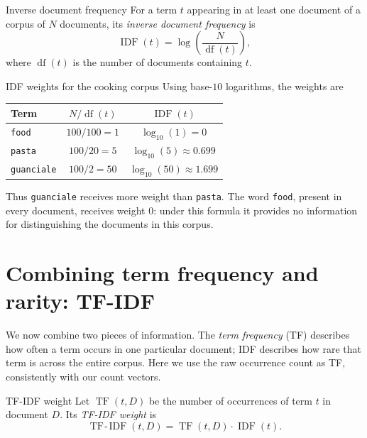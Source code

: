\documentclass[a4paper,12pt,oneside]{report}
\begin{document}
\begin{frameddefn}{Inverse document frequency}\label{def:idf}
For a term $t$ appearing in at least one document of a corpus of $N$
documents, its \emph{inverse document frequency} is
\[
  \operatorname{IDF}(t)
  =\log\left(\frac{N}{\operatorname{df}(t)}\right),
\]
where $\operatorname{df}(t)$ is the number of documents containing $t$.
\end{frameddefn}

\begin{framedexample}{IDF weights for the cooking corpus}
Using base-$10$ logarithms, the weights are
\begin{center}
\begin{tabular}{l|c|c}
  Term & $N/\operatorname{df}(t)$ & $\operatorname{IDF}(t)$\\\hline
  \texttt{food} & $100/100=1$ & $\log_{10}(1)=0$\\
  \texttt{pasta} & $100/20=5$ & $\log_{10}(5)\approx0.699$\\
  \texttt{guanciale} & $100/2=50$ & $\log_{10}(50)\approx1.699$
\end{tabular}
\end{center}
Thus \texttt{guanciale} receives more weight than \texttt{pasta}.
The word \texttt{food}, present in every document, receives weight
$0$: under this formula it provides no information for distinguishing
the documents in this corpus.
\end{framedexample}

\section{Combining term frequency and rarity: TF-IDF}

We now combine two pieces of information. The \emph{term frequency}
(TF) describes how often a term occurs in one particular document;
IDF describes how rare that term is across the entire corpus. Here
we use the raw occurrence count as TF, consistently with our count
vectors.

\begin{frameddefn}{TF-IDF weight}\label{def:tf-idf}
Let $\operatorname{TF}(t,D)$ be the number of occurrences of term $t$
in document $D$. Its \emph{TF-IDF weight} is
\[
  \operatorname{TF\!\text{-}\!IDF}(t,D)
  =\operatorname{TF}(t,D)\cdot\operatorname{IDF}(t).
\]
\end{frameddefn}
\end{document}
